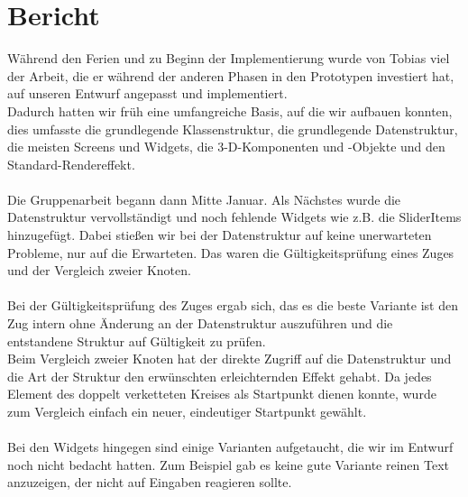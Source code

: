 \chapter{Bericht}
Während den Ferien und zu Beginn der Implementierung wurde von Tobias viel der Arbeit, die er während der anderen Phasen in den Prototypen investiert hat, auf unseren Entwurf angepasst und implementiert.
\\
Dadurch hatten wir früh eine umfangreiche Basis, auf die wir aufbauen konnten, dies umfasste die grundlegende Klassenstruktur, die grundlegende Datenstruktur, die meisten Screens und Widgets, die 3-D-Komponenten und -Objekte und den Standard-Rendereffekt.
\\\\
Die Gruppenarbeit begann dann Mitte Januar.
Als Nächstes wurde die Datenstruktur vervollständigt und noch fehlende Widgets wie z.B. die SliderItems hinzugefügt.
Dabei stießen wir bei der Datenstruktur auf keine unerwarteten Probleme, nur auf die Erwarteten.
Das waren die Gültigkeitsprüfung eines Zuges und der Vergleich zweier Knoten.
\\\\
Bei der Gültigkeitsprüfung des Zuges ergab sich, das es die beste Variante ist den Zug intern ohne Änderung an der Datenstruktur auszuführen und die entstandene Struktur auf Gültigkeit zu prüfen.
\\
Beim Vergleich zweier Knoten hat der direkte Zugriff auf die Datenstruktur und die Art der Struktur den erwünschten erleichternden Effekt gehabt. Da jedes Element des doppelt verketteten Kreises als Startpunkt dienen konnte, wurde zum Vergleich einfach ein neuer, eindeutiger Startpunkt gewählt.
\\\\
Bei den Widgets hingegen sind einige Varianten aufgetaucht, die wir im Entwurf noch nicht bedacht hatten. Zum Beispiel gab es keine gute Variante reinen Text anzuzeigen, der nicht auf Eingaben reagieren sollte.
\\\\


